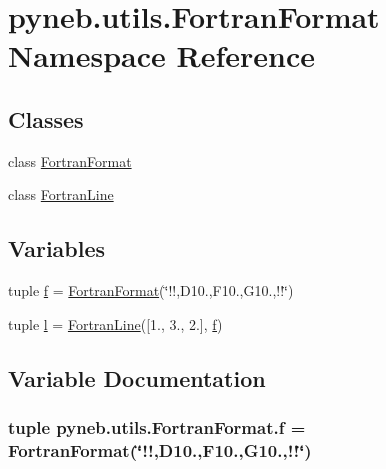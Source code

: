 \hypertarget{namespacepyneb_1_1utils_1_1_fortran_format}{}\section{pyneb.\+utils.\+Fortran\+Format Namespace Reference}
\label{namespacepyneb_1_1utils_1_1_fortran_format}
\subsection*{Classes}
\begin{DoxyCompactItemize}
\item 
class \hyperlink{classpyneb_1_1utils_1_1_fortran_format_1_1_fortran_format}{Fortran\+Format}
\item 
class \hyperlink{classpyneb_1_1utils_1_1_fortran_format_1_1_fortran_line}{Fortran\+Line}
\end{DoxyCompactItemize}
\subsection*{Variables}
\begin{DoxyCompactItemize}
\item 
tuple \hyperlink{namespacepyneb_1_1utils_1_1_fortran_format_af94352584eced016c14d524330879115}{f} = \hyperlink{classpyneb_1_1utils_1_1_fortran_format_1_1_fortran_format}{Fortran\+Format}(\char`\"{}\textquotesingle{}!!\textquotesingle{},D10.,F10.,G10.,\textquotesingle{}!!\textquotesingle{}\char`\"{})
\item 
tuple \hyperlink{namespacepyneb_1_1utils_1_1_fortran_format_a80ea829e31363f67a89c70955e194b93}{l} = \hyperlink{classpyneb_1_1utils_1_1_fortran_format_1_1_fortran_line}{Fortran\+Line}(\mbox{[}1., 3., 2.\mbox{]}, \hyperlink{namespacepyneb_1_1utils_1_1_fortran_format_af94352584eced016c14d524330879115}{f})
\end{DoxyCompactItemize}


\subsection{Variable Documentation}
\hypertarget{namespacepyneb_1_1utils_1_1_fortran_format_af94352584eced016c14d524330879115}{}
\subsubsection[{f}]{\setlength{\rightskip}{0pt plus 5cm}tuple pyneb.\+utils.\+Fortran\+Format.\+f = {\bf Fortran\+Format}(\char`\"{}\textquotesingle{}!!\textquotesingle{},D10.,F10.,G10.,\textquotesingle{}!!\textquotesingle{}\char`\"{})}\label{namespacepyneb_1_1utils_1_1_fortran_format_af94352584eced016c14d524330879115}


